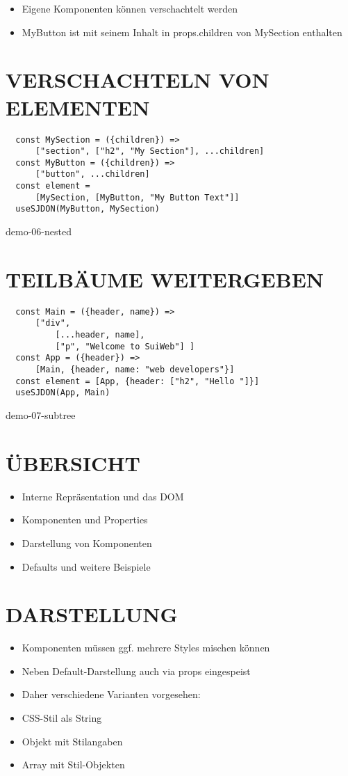   \begin{itemize}
    \item Eigene Komponenten können verschachtelt werden
    \item MyButton ist mit seinem Inhalt in props.children von MySection enthalten
  \end{itemize}
  
  \section*{VERSCHACHTELN VON ELEMENTEN}
  \begin{verbatim}
  const MySection = ({children}) =>
      ["section", ["h2", "My Section"], ...children]
  const MyButton = ({children}) =>
      ["button", ...children]
  const element =
      [MySection, [MyButton, "My Button Text"]]
  useSJDON(MyButton, MySection)
  \end{verbatim}
  
  demo-06-nested
  
  \section*{TEILBÄUME WEITERGEBEN}
  \begin{verbatim}
  const Main = ({header, name}) =>
      ["div",
          [...header, name],
          ["p", "Welcome to SuiWeb"] ]
  const App = ({header}) =>
      [Main, {header, name: "web developers"}]
  const element = [App, {header: ["h2", "Hello "]}]
  useSJDON(App, Main)
  \end{verbatim}
  
  demo-07-subtree
  
  \section*{ÜBERSICHT}
  \begin{itemize}
    \item Interne Repräsentation und das DOM
    \item Komponenten und Properties
    \item Darstellung von Komponenten
    \item Defaults und weitere Beispiele
  \end{itemize}
  
  \section*{DARSTELLUNG}
  \begin{itemize}
    \item Komponenten müssen ggf. mehrere Styles mischen können
    \item Neben Default-Darstellung auch via props eingespeist
    \item Daher verschiedene Varianten vorgesehen:
    \item CSS-Stil als String
    \item Objekt mit Stilangaben
    \item Array mit Stil-Objekten
  \end{itemize}
  
